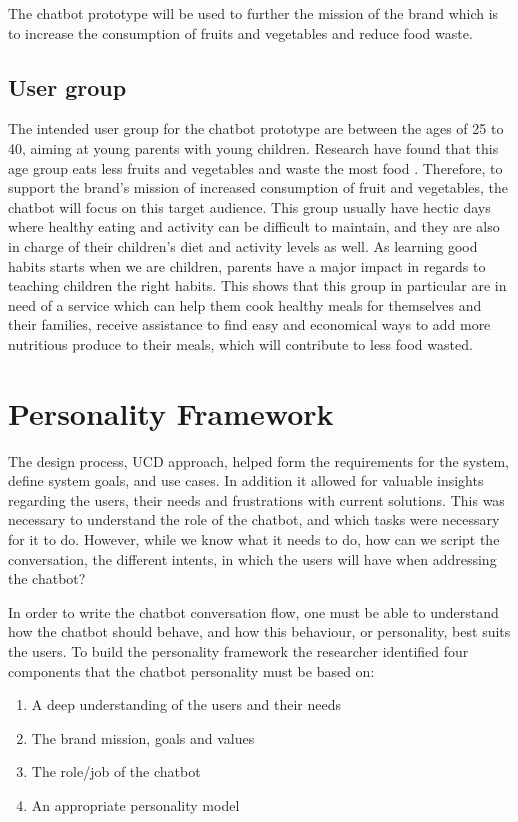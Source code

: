 The chatbot prototype will be used to further the mission of the brand which is to increase the consumption of fruits and vegetables and reduce food waste. 

\subsection{User group}

The intended user group for the chatbot prototype are between the ages of 25 to 40, aiming at young parents with young children. Research have found that this age group eats less fruits and vegetables and waste the most food 
. Therefore, to support the brand's mission of increased consumption of fruit and vegetables, the chatbot will focus on this target audience. This group usually have hectic days where healthy eating and activity can be difficult to maintain, and they are also in charge of their children’s diet and activity levels as well. As learning good habits starts when we are children, parents have a major impact in regards to teaching children the right habits. This shows that this group in particular are in need of a service which can help them cook healthy meals for themselves and their families, receive assistance to find easy and economical ways to add more nutritious produce to their meals, which will contribute to less food wasted.

\section{Personality Framework}

The design process, UCD approach, helped form the requirements for the system, define system goals, and use cases. In addition it allowed for valuable insights regarding the users, their needs and frustrations with current solutions. This was necessary to understand the role of the chatbot, and which tasks were necessary for it to do. However, while we know what it needs to do, how can we script the conversation, the different intents, in which the users will have when addressing the chatbot? 

In order to write the chatbot conversation flow, one must be able to understand how the chatbot should behave, and how this behaviour, or personality, best suits the users. To build the personality framework the researcher identified four components that the chatbot personality must be based on:

\begin{enumerate}
    \item A deep understanding of the users and their needs %
    \item The brand mission, goals and values
    \item The role/job of the chatbot
    \item An appropriate personality model
\end{enumerate}

